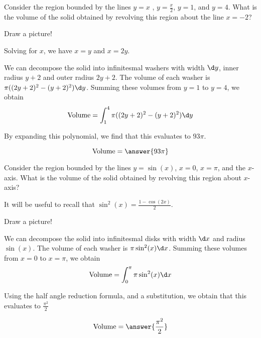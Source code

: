 \documentclass[handout]{ximera}
\begin{document}
\begin{exercise}
Consider the region bounded by the lines $y = x$ , $y=\frac{x}{2}$,
$y=1$, and $y = 4$.  What is the volume of the solid obtained by
revolving this region about the line $x=-2$?

\begin{hint}
	Draw a picture!
\end{hint}

\begin{hint}
	Solving for $x$, we have $x=y$ and $x = 2y$.
\end{hint}

\begin{hint}
  We can decompose the solid into infinitesmal washers with width $\d
  y$, inner radius $y+2$ and outer radius $2y+2$. The volume of each
  washer is $\pi((2y+2)^2-(y+2)^2)\d y$.  Summing these volumes from
  $y=1$ to $y=4$, we obtain
  \[
  \textrm{Volume} = \int_1^4 \pi((2y+2)^2-(y+2)^2)\d y
  \]
\end{hint}


\begin{hint}
  By expanding this polynomial, we find that this evaluates to
  $93\pi$.
\end{hint}
\begin{prompt}
  \[
  \textrm{Volume} = \answer{93\pi}
  \]
\end{prompt}

\end{exercise}


\begin{exercise}
Consider the region bounded by the lines $y = \sin(x)$, $x=0$,
$x=\pi$, and the $x$-axis.  What is the volume of the solid obtained
by revolving this region about $x$-axis?

It will be useful to recall that $\sin^2(x) = \frac{1-\cos(2x)}{2}$.

\begin{hint}
  Draw a picture!
\end{hint}

\begin{hint}
  We can decompose the solid into infinitesmal disks with width
  $\d x$ and radius $\sin(x)$. The volume of each washer is $\pi
  \sin^2(x)\d x$.  Summing these volumes from $x=0$ to $x=\pi$,
  we obtain
  \[
  \textrm{Volume} = \int_0^\pi \pi \sin^2(x)\d x
  \]
\end{hint}

\begin{hint}
  Using the half angle reduction formula, and a substitution, we obtain that this evaluates to $\frac{\pi^2}{2}$
\end{hint}

\begin{prompt}
  \[
  \textrm{Volume} = \answer{\frac{\pi^2}{2}}
  \]
\end{prompt}

\end{exercise}
\end{document}
